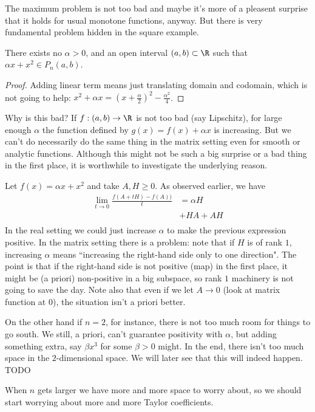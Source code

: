 The maximum problem is not too bad and maybe it's more of a pleasent surprise that it holds for usual monotone functions, anyway. But there is very fundamental problem hidden in the square example.

\begin{prop}
	There exists no $\alpha > 0$, and an open interval $(a, b) \subset \R$ such that $\alpha x + x^{2} \in P_{n}(a, b)$.
\end{prop}
\begin{proof}
	Adding linear term means just translating domain and codomain, which is not going to help: $x^2 + \alpha x = (x + \frac{\alpha}{2})^2 - \frac{\alpha^2}{4}$.
\end{proof}

Why is this bad? If $f : (a, b) \to \R$ is not too bad (say Lipschitz), for large enough $\alpha$ the function defined by $g(x) = f(x) + \alpha x$ is increasing. But we can't do necessarily do the same thing in the matrix setting even for smooth or analytic functions. Although this might not be such a big surprise or a bad thing in the first place, it is worthwhile to investigate the underlying reason.

Let $f(x) = \alpha x + x^2$ and take $A, H \geq 0$. As observed earlier, we have
\begin{align*}
	\lim_{t \to 0} \frac{f(A + t H) - f(A))}{t} &= \alpha H \\
	&+ H A + A H\\
\end{align*}
In the real setting we could just increase $\alpha$ to make the previous expression positive. In the matrix setting there is a problem: note that if $H$ is of rank $1$, increasing $\alpha$ means ``increasing the right-hand side only to one direction". The point is that if the right-hand side is not positive (map) in the first place, it might be (a priori) non-positive in a big subspace, so rank $1$ machinery is not going to save the day. Note also that even if we let $A \to 0$ (look at matrix function at $0$), the situation isn't a priori better.

On the other hand if $n = 2$, for instance, there is not too much room for things to go south. We still, a priori, can't guarantee positivity with $\alpha$, but adding something extra, say $\beta x^3$ for some $\beta > 0$ might. In the end, there isn't too much space in the $2$-dimensional space. We will later see that this will indeed happen. TODO

When $n$ gets larger we have more and more space to worry about, so we should start worrying about more and more Taylor coefficients.

